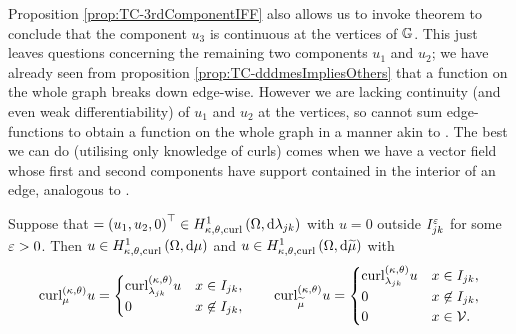 Proposition \ref{prop:TC-3rdComponentIFF} also allows us to invoke theorem  to conclude that the component $u_3$ is continuous at the vertices of $\mathbb{G}$.
This just leaves questions concerning the remaining two components $u_1$ and $u_2$; we have already seen from proposition \ref{prop:TC-dddmesImpliesOthers} that a function on the whole graph breaks down edge-wise.
However we are lacking continuity (and even weak differentiability) of $u_1$ and $u_2$ at the vertices, so cannot sum edge-functions to obtain a function on the whole graph in a manner akin to .
The best we can do (utilising only knowledge of curls) comes when we have a vector field whose first and second components have support contained in the interior of an edge, analogous to .
\begin{prop}
	Suppose that $=\left( u_1,u_2,0 \right)^\top\in H^1_{\kappa,\theta,\mathrm{curl}}\left( \Omega, \mathrm{d}\lambda_{jk} \right)$ with $u=0$ outside $I_{jk}^\varepsilon$ for some $\varepsilon>0$.
	Then $u\in H^1_{\kappa,\theta,\mathrm{curl}}\left( \Omega, \mathrm{d}\mu \right)$ and $u\in H^1_{\kappa,\theta,\mathrm{curl}}\left( \Omega, \mathrm{d}\widetilde{\mu} \right)$ with
	\begin{align*}
		\mathrm{curl}_{\mu}^{\left( \kappa, \theta \right)}u =
		\begin{cases} 
			\mathrm{curl}_{\lambda_{jk}}^{\left( \kappa, \theta \right)}u & x\in I_{jk}, \\
			0 & x\not\in I_{jk}, 
		\end{cases}
		\qquad
		\mathrm{curl}_{\widetilde{\mu}}^{\left( \kappa, \theta \right)}u = 
		\begin{cases} 
			\mathrm{curl}_{\lambda_{jk}}^{\left( \kappa, \theta \right)}u & x\in I_{jk}, \\
			0 & x\not\in I_{jk}, \\
			0 & x\in\mathcal{V}.
		\end{cases}
	\end{align*}
\end{prop}

